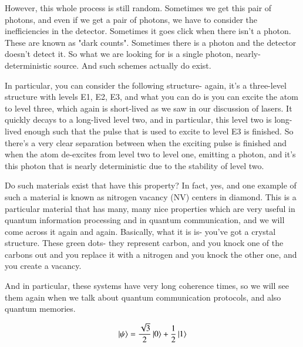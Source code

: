 However, this whole process is still random. Sometimes we get this pair of photons, and even if we get a pair of photons, we have to consider the inefficiencies in the detector. Sometimes it goes click when there isn't a photon. These are known as "dark counts". Sometimes there is a photon and the detector doesn't detect it. So what we are looking for is a single photon, nearly-deterministic source. And such schemes actually do exist.

In particular, you can consider the following structure- again, it's a three-level structure with levels E1, E2, E3, and what you can do is you can excite the atom to level three, which again is short-lived as we saw in our discussion of lasers. It quickly decays to a long-lived level two, and in particular, this level two is long-lived enough such that the pulse that is used to excite to level E3 is finished. So there's a very clear separation between when the exciting pulse is finished and when the atom de-excites from level two to level one, emitting a photon, and it's this photon that is nearly deterministic due to the stability of level two.

Do such materials exist that have this property? In fact, yes, and one example of such a material is known as nitrogen vacancy (NV) centers in diamond. This is a particular material that has many, many nice properties which are very useful in quantum information processing and in quantum communication, and we will come across it again and again. Basically, what it is is- you've got a crystal structure. These green dots- they represent carbon, and you knock one of the carbons out and you replace it with a nitrogen and you knock the other one, and you create a vacancy.

And in particular, these systems have very long coherence times, so we will see them again when we talk about quantum communication protocols, and also quantum memories.


\newpage
\begin{exercises}
\begin{equation*}
\ket{\psi} = \frac{\sqrt{3}}{2}\ket{0} + \frac{1}{2}\ket{1}
\end{equation*}


\end{exercises}

